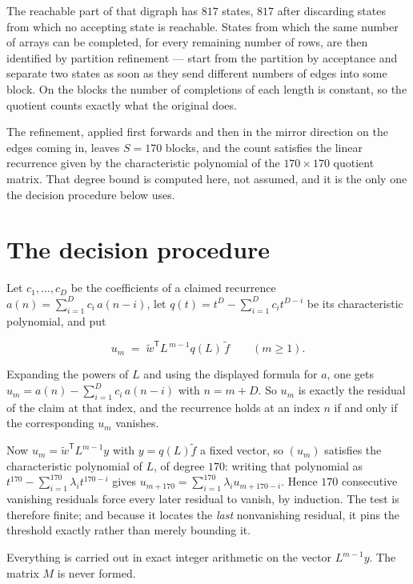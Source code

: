 \documentclass[11pt]{article}
\theoremstyle{definition}
\begin{document}
The reachable part of that digraph has $817$ states, $817$ after discarding states from which no accepting state is reachable. States from which the same number of arrays can be completed, for every remaining number of rows, are then identified by partition refinement --- start from the partition by acceptance and separate two states as soon as they send different numbers of edges into some block. On the blocks the number of completions of each length is constant, so the quotient counts exactly what the original does.

The refinement, applied first forwards and then in the mirror direction on the edges coming in, leaves $S = 170$ blocks, and the count satisfies the linear recurrence given by the characteristic polynomial of the $170 \times 170$ quotient matrix. That degree bound is computed here, not assumed, and it is the only one the decision procedure below uses.

\section{The decision procedure}

Let $c_1,\dots,c_D$ be the coefficients of a claimed recurrence $a(n) = \sum_{i=1}^{D} c_i\,a(n-i)$, let $q(t) = t^{D} - \sum_{i=1}^{D} c_i t^{D-i}$ be its characteristic polynomial, and put

\[u_m \;=\; \tilde w^{\mathsf T} L^{\,m-1} q(L)\,\tilde f \qquad (m \ge 1).\]

Expanding the powers of $L$ and using the displayed formula for $a$, one gets $u_m = a(n) - \sum_{i=1}^{D} c_i\,a(n-i)$ with $n = m + D$. So $u_m$ is exactly the residual of the claim at that index, and the recurrence holds at an index $n$ if and only if the corresponding $u_m$ vanishes.

Now $u_m = \tilde w^{\mathsf T} L^{m-1} y$ with $y = q(L)\tilde f$ a fixed vector, so $(u_m)$ satisfies the characteristic polynomial of $L$, of degree $170$: writing that polynomial as $t^{170} - \sum_{i=1}^{170} \lambda_i t^{170-i}$ gives $u_{m+170} = \sum_{i=1}^{170} \lambda_i u_{m+170-i}$. Hence $170$ consecutive vanishing residuals force every later residual to vanish, by induction. The test is therefore finite; and because it locates the {\itshape last} nonvanishing residual, it pins the threshold exactly rather than merely bounding it.

Everything is carried out in exact integer arithmetic on the vector $L^{m-1}y$. The matrix $M$ is never formed.
\end{document}
